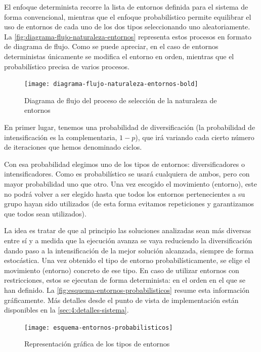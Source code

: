 El enfoque determinista recorre la lista de entornos definida para el sistema de forma convencional, mientras que el enfoque probabilístico permite equilibrar el uso de entornos de cada uno de los dos tipos seleccionando uno aleatoriamente. La \autoref{fig:diagrama-flujo-naturaleza-entornos} representa  estos procesos en formato de diagrama de flujo. Como se puede apreciar, en el caso de entornos deterministas únicamente se modifica el entorno en orden, mientras que el probabilístico precisa de varios procesos.

\begin{figure}
    \centering    \texttt{[image: diagrama-flujo-naturaleza-entornos-bold]}
    \caption{Diagrama de flujo del proceso de selección de la naturaleza de entornos}
    \label{fig:diagrama-flujo-naturaleza-entornos}
\end{figure}

En primer lugar, tenemos una probabilidad de diversificación (la probabilidad de intensificación es la complementaria, $1-p$), que irá variando cada cierto número de iteraciones que hemos denominado ciclos.

Con esa probabilidad elegimos uno de los tipos de entornos: diversificadores o intensificadores. Como es probabilístico se usará cualquiera de ambos, pero con mayor probabilidad uno que otro. Una vez escogido el movimiento (entorno), este no podrá volver a ser elegido hasta que todos los entornos pertenecientes a su grupo hayan sido utilizados (de esta forma evitamos repeticiones y garantizamos que todos sean utilizados).

La idea es tratar de que al principio las soluciones analizadas sean más diversas entre sí y a medida que la ejecución avanza se vaya reduciendo la diversificación dando paso a la intensificación de la mejor solución alcanzada, siempre de forma estocástica. Una vez obtenido el tipo de entorno probabilísticamente, se elige el movimiento (entorno) concreto de ese tipo. En caso de utilizar entornos con restricciones, estos se ejecutan de forma determinista: en el orden en el que se han definido. La \autoref{fig:esquema-entornos-probabilisticos} resume esta información gráficamente. Más detalles desde el punto de vista de implementación están disponibles en la \autoref{sec:4:detalles-sistema}.

\begin{figure}
    \centering    \texttt{[image: esquema-entornos-probabilisticos]}
    \caption{Representación gráfica de los tipos de entornos}
    \label{fig:esquema-entornos-probabilisticos}
\end{figure}


